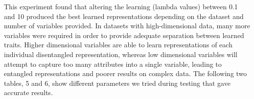 \documentclass[conference,11pt]{IEEEtran}
\begin{document}
This experiment found that altering the learning (lambda values) between 0.1 and 10 produced the best learned representations depending on the dataset and number of variables provided. In datasets with high-dimensional data, many more variables were required in order to provide adequate separation between learned traits. Higher dimensional variables are able to learn representations of each individual disentangled representation, whereas low dimensional variables will attempt to capture too many attributes into a single variable, leading to entangled representations and poorer results on complex data.  The following two tables, 5 and 6, show different parameters we tried during testing that gave accurate results. 

\begin{table}[h]
\centering
\caption{Hyperparameters for Facial Recognition - Categorical Results}
\end{table}

\begin{table}[h]
\centering
\caption{Hyperparameters for Facial Recognition - Continuous Results}
\end{table}
\end{document}
